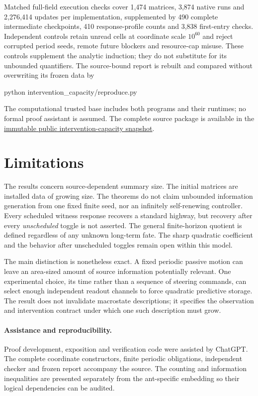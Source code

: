 \documentclass[11pt]{article}
\theoremstyle{definition}\newtheorem{definition}[theorem]{Definition}
\begin{document}
Matched full-field execution checks cover 1,474 matrices, 3,874 native runs and
2,276,414 updates per implementation, supplemented by 490 complete intermediate
checkpoints, 410 response-profile counts and 3,838 first-entry checks. Independent
controls retain unread cells at coordinate scale $10^{60}$ and reject corrupted
period seeds, remote future blockers and resource-cap misuse. These controls
supplement the analytic induction; they do not substitute for its unbounded
quantifiers. The source-bound report is rebuilt and compared without overwriting
its frozen data by
\begin{center}\small\ttfamily
python intervention\_capacity/reproduce.py
\end{center}
The computational trusted base includes both programs and their runtimes; no
formal proof assistant is assumed. The complete source package is available
in the \href{https://github.com/kehao95/langtons-ant-core/tree/3ae4ce12abf6ad44a5c7625b31d25e6f1365ffa3/intervention_capacity}{immutable public intervention-capacity snapshot}.

\section{Limitations}
The results concern source-dependent summary size. The initial matrices are
installed data of growing size. The theorems do not
claim unbounded information generation from one fixed finite seed, nor an
infinitely self-renewing controller. Every scheduled witness response recovers a
standard highway, but recovery after every \emph{unscheduled} toggle is not
asserted. The general finite-horizon quotient is defined regardless of any
unknown long-term fate. The sharp quadratic coefficient and the behavior after unscheduled toggles
remain open within this model.

The main distinction is nonetheless exact. A fixed periodic passive motion can
leave an area-sized amount of source information potentially relevant. One
experimental choice, its time rather than a sequence of steering commands, can
select enough independent readout channels to force quadratic predictive storage.
The result does not invalidate macrostate descriptions; it specifies the
observation and intervention contract under which one such description must grow.

\paragraph{Assistance and reproducibility.}
Proof development, exposition and verification code were assisted by ChatGPT.
The complete coordinate constructors, finite periodic obligations, independent
checker and frozen report accompany the source. The counting and information
inequalities are presented separately from the ant-specific embedding so their
logical dependencies can be audited.
\end{document}
